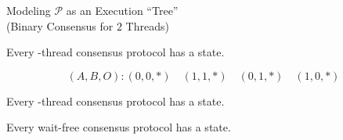 \begin{frame}{}
  \begin{center}
    Modeling $\mathcal{P}$ as an Execution ``Tree'' \\[2pt]
    {\small (Binary Consensus for $2$ Threads)}
  \end{center}
  
  \begin{center}
    
  \end{center}
\end{frame}

\begin{frame}{}
  \begin{theorem}
    Every -thread  consensus protocol has a  state.
  \end{theorem}

  \pause
  \[
    (A, B, O): (0,0,\ast) \quad (1,1,\ast) \quad (0,1,\ast) \quad (1,0,\ast)
  \]

  \pause
\end{frame}

\begin{frame}{}
  \begin{theorem}
    Every -thread consensus protocol has a  state.
  \end{theorem}

  \pause
  \vspace{0.30cm}
  \begin{theorem}
    Every wait-free consensus protocol has a  state.
  \end{theorem}

  \pause
  \begin{center}
    
  \end{center}
\end{frame}
